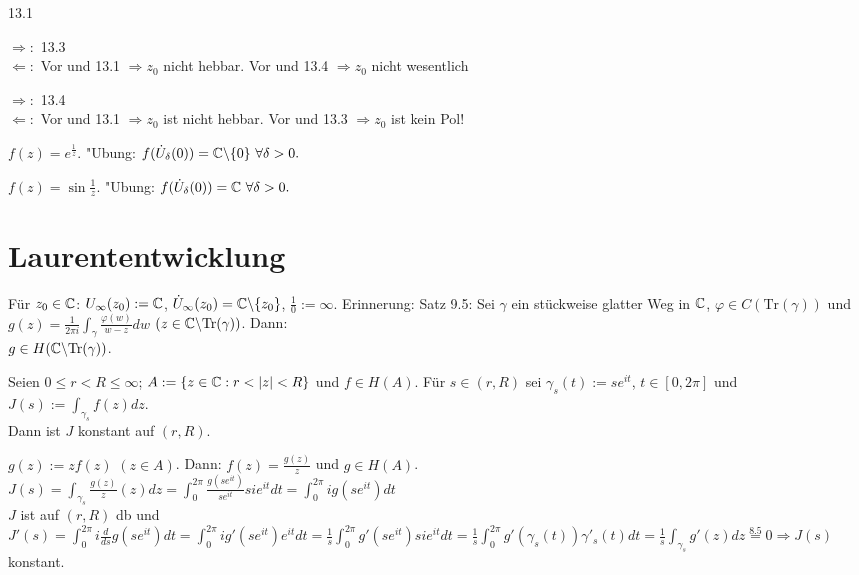 \documentclass[a4paper,twoside,DIV15,BCOR12mm]{scrbook}
\begin{document}
\begin{beweis}
\begin{liste}
\item 13.1
\item $\Rightarrow:$ 13.3\\
$\Leftarrow:$ Vor und 13.1 $\Rightarrow z_0$ nicht hebbar. Vor und 13.4 $\Rightarrow z_0$ nicht wesentlich
\item $\Rightarrow:$ 13.4\\
$\Leftarrow:$ Vor und 13.1 $\Rightarrow z_0$ ist nicht hebbar. Vor und 13.3 $\Rightarrow z_0$ ist kein Pol!
\end{liste}
\end{beweis}

\begin{beispiele}
\begin{liste}
\item $f(z) = e^{\frac1z}.$ "Ubung: $f(\dot{U}_{\delta}(0)) = \mathbb{C} \backslash \{0\} \ \forall \delta > 0.$
\item $f(z) = \sin \frac1z$. "Ubung: $f(\dot{U}_{\delta}(0)) = \MdC \ \forall \delta > 0.$
\end{liste}
\end{beispiele}

\chapter{Laurententwicklung}

Für $z_0 \in \mathbb{C}$: $U_\infty(z_0) := \mathbb{C}$, $\dot{U}_\infty(z_0) = \mathbb{C} \backslash \{z_0\}$, 
$\frac{1}{0} := \infty$. Erinnerung: Satz 9.5: Sei $\gamma$ ein stückweise glatter Weg in $\mathbb{C}$, 
$\varphi \in C(\text{Tr}(\gamma))$ und $g(z) = \frac{1}{2 \pi i}\int_{\gamma}\frac{\varphi(w)}{w-z}dw$ 
$(z \in  \mathbb{C} \backslash \text{Tr}(\gamma) )$. Dann: \\
$g \in H( \mathbb{C} \backslash \text{Tr}(\gamma))$.

\begin{satz}
  Seien $ 0 \le r < R \le \infty$; $A := \{ z \in \mathbb{C} : r < |z| < R \}$ und $f \in H(A)$. Für $s \in (r,R)$ sei 
  $\gamma_s(t) := se^{it}$, $t \in [0,2 \pi ]$ und $J(s) := \int_{\gamma_s} f(z) dz$. \\
  Dann ist $J$ konstant auf $(r, R)$.
\end{satz}

\begin{beweis} 
  $g(z) := z f(z)$  $(z \in A)$. Dann: 
  $f(z) = \frac{g(z)}{z}$ und $g \in H(A)$. \\
  $J(s) = \int_{\gamma_s} \frac{g(z)}{z}(z) dz = \int_0^{2 \pi} \frac{g(se^{it})}{se^{it}}sie^{it} dt =  
  \int_0^{2 \pi} ig(se^{it}) dt$\\
  $J$ ist auf $(r,R)$ db und $J'(s) = \int_0^{2 \pi} i \frac{d}{ds}g(se^{it}) dt = \int_0^{2 \pi} i g'(se^{it})e^{it}  dt = 
  \frac{1}{s} \int_0^{2 \pi} g'(se^{it})sie^{it}  dt =  \frac{1}{s} \int_0^{2 \pi} g'(\gamma_s(t))\gamma'_s(t) dt =
  \frac{1}{s} \int_{\gamma_s} g'(z) dz \stackrel{8.5}{=} 0 \Rightarrow J(s)$ konstant.
\end{beweis}
\end{document}
